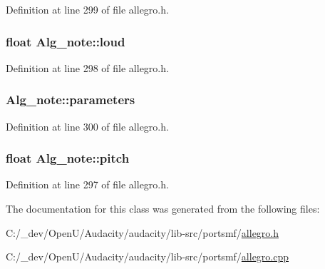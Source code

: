 Definition at line 299 of file allegro.\+h.

\subsubsection[{\texorpdfstring{loud}{loud}}]{\setlength{\rightskip}{0pt plus 5cm}float Alg\+\_\+note\+::loud}\hypertarget{class_alg__note_aefa0a5b76a5747b0e95f96bc8046e199}{}\label{class_alg__note_aefa0a5b76a5747b0e95f96bc8046e199}


Definition at line 298 of file allegro.\+h.

\subsubsection[{\texorpdfstring{parameters}{parameters}}]{ Alg\+\_\+note\+::parameters}\hypertarget{class_alg__note_ae70e47b4c5fb53e7f90a4fdc0f132d0e}{}\label{class_alg__note_ae70e47b4c5fb53e7f90a4fdc0f132d0e}


Definition at line 300 of file allegro.\+h.

\subsubsection[{\texorpdfstring{pitch}{pitch}}]{\setlength{\rightskip}{0pt plus 5cm}float Alg\+\_\+note\+::pitch}\hypertarget{class_alg__note_a01dc46324d580898c16fe09d2e85c424}{}\label{class_alg__note_a01dc46324d580898c16fe09d2e85c424}


Definition at line 297 of file allegro.\+h.



The documentation for this class was generated from the following files\+:\begin{DoxyCompactItemize}
\item 
C\+:/\+\_\+dev/\+Open\+U/\+Audacity/audacity/lib-\/src/portsmf/\hyperlink{allegro_8h}{allegro.\+h}\item 
C\+:/\+\_\+dev/\+Open\+U/\+Audacity/audacity/lib-\/src/portsmf/\hyperlink{allegro_8cpp}{allegro.\+cpp}\end{DoxyCompactItemize}
